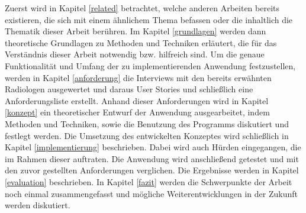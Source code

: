 Zuerst wird in Kapitel \ref{related} betrachtet, welche anderen Arbeiten bereits existieren, die sich mit einem ähnlichem Thema befassen oder die inhaltlich die Thematik dieser Arbeit berühren. 
Im Kapitel \ref{grundlagen} werden dann theoretische Grundlagen zu Methoden und Techniken erläutert, die für das Verständnis dieser Arbeit notwendig bzw. hilfreich sind.
Um die genaue Funktionalität und Umfang der zu implementierenden Anwendung festzustellen, werden in Kapitel \ref{anforderung} die Interviews mit den bereits erwähnten Radiologen ausgewertet und daraus User Stories und schließlich eine Anforderungsliste erstellt.
Anhand dieser Anforderungen wird in Kapitel \ref{konzept} ein theoretischer Entwurf der Anwendung ausgearbeitet, indem Methoden und Techniken, sowie die Benutzung des Programms diskutiert und festlegt werden.
Die Umsetzung des entwickelten Konzeptes wird schließlich in Kapitel \ref{implementierung} beschrieben. Dabei wird auch Hürden eingegangen, die im Rahmen dieser auftraten.
Die Anwendung wird anschließend getestet und mit den zuvor gestellten Anforderungen verglichen. Die Ergebnisse werden in Kapitel \ref{evaluation} beschrieben. 
In Kapitel \ref{fazit} werden die Schwerpunkte der Arbeit noch einmal zusammengefasst und mögliche Weiterentwicklungen in der Zukunft werden diskutiert. 
 